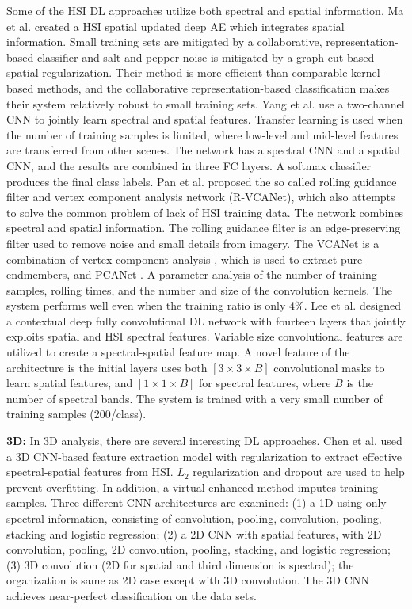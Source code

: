 \documentclass[12pt]{spieman}
\begin{document}
\begin{spacing}{1}
Some of the HSI DL approaches utilize both spectral and spatial information. Ma et al. \cite{ma2016spectral} created a HSI spatial updated deep AE which integrates spatial information. Small training sets are mitigated by a collaborative, representation-based classifier and salt-and-pepper noise is mitigated by a graph-cut-based spatial regularization. Their method is more efficient than comparable kernel-based methods, and the collaborative representation-based classification makes their system relatively robust to small training sets. Yang et al. \cite{Yang2016Two} use a two-channel CNN to jointly learn spectral and spatial features. Transfer learning is used when the number of training samples is limited, where low-level and mid-level features are transferred from other scenes. The network has a spectral CNN and a spatial CNN, and the results are combined in three FC layers. A softmax classifier produces the final class labels. Pan et al. \cite{Pan2017RVCANet} proposed the so called rolling guidance filter and vertex component analysis network (R-VCANet), which also attempts to solve the common problem of lack of HSI training data. The network combines spectral and spatial information. The rolling guidance filter is an edge-preserving filter used to remove noise and small details from imagery. The VCANet is a combination of vertex component analysis \cite{nascimento2005vertex} , which is used to extract pure endmembers, and PCANet \cite{Chan2015PCANet} . A parameter analysis of the number of training samples, rolling times, and the number and size of the convolution kernels. The system performs well even when the training ratio is only 4\%. Lee et al. \cite{Lee2016Contextual} designed a contextual deep fully convolutional DL network with fourteen layers that jointly exploits spatial and HSI spectral features. Variable size convolutional features are utilized to create a spectral-spatial feature map. A novel feature of the architecture is the initial layers uses both $[3 \times 3 \times B]$ convolutional masks to learn spatial features, and $[1 \times 1 \times B]$ for spectral features, where $B$ is the number of spectral bands. The system is trained with a very small number of training samples (200/class).

\textbf{3D:} In 3D analysis, there are several interesting DL approaches. Chen et al. \cite{Chen2016Deep} used a 3D CNN-based feature extraction model with regularization to extract effective spectral-spatial features from HSI. $L_{2}$ regularization and dropout are used to help prevent overfitting. In addition, a virtual enhanced method imputes training samples. Three different CNN architectures are examined: (1) a 1D using only spectral information, consisting of convolution, pooling, convolution, pooling, stacking and logistic regression; (2) a 2D CNN with spatial features, with 2D convolution, pooling, 2D convolution, pooling, stacking, and logistic regression; (3) 3D convolution (2D for spatial and third dimension is spectral); the organization is same as 2D case except with 3D convolution. The 3D CNN achieves near-perfect classification on the data sets. 


\end{spacing}
\end{document}
